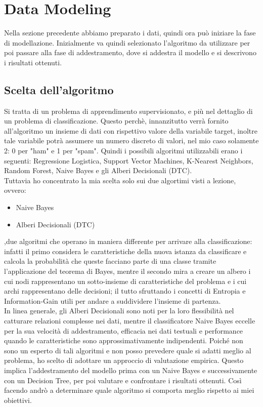 \documentclass[]{article}
\begin{document}
        \newpage
        \section{Data Modeling}
            Nella sezione precedente abbiamo preparato i dati, quindi ora può iniziare la fase di modellazione. Inizialmente va quindi selezionato l’algoritmo da
            utilizzare per poi passare alla fase di addestramento, dove si addestra il modello e si descrivono i risultati ottenuti.

            \subsection{Scelta dell'algoritmo}
                Si tratta di un problema di apprendimento supervisionato, e più nel dettaglio di un problema di classificazione. Questo perchè, innanzitutto verrà fornito all'algoritmo un insieme di dati con rispettivo valore della variabile target, inoltre tale variabile potrà assumere un numero discreto di valori, nel mio caso solamente 2: 0 per "ham" e 1 per "spam". Quindi i possibili algoritmi utilizzabili erano i seguenti: Regressione Logistica, Support Vector Machines, K-Nearest Neighbors, Random Forest, Naive Bayes e gli Alberi Decisionali (DTC).\\
                Tuttavia ho concentrato la mia scelta solo sui due algortimi visti a lezione, ovvero:
                \begin{itemize}
                    \item Naive Bayes
                    \item Alberi Decisionali (DTC)
                \end{itemize}
                ,due algoritmi che operano in maniera differente per arrivare alla classificazione: infatti il primo considera le caratteristiche della nuova istanza da classificare e calcola la probabilità che queste facciano parte di una classe tramite l’applicazione del teorema di Bayes, mentre il secondo mira a creare un albero i cui nodi rappresentano un sotto-insieme di caratteristiche del problema e i cui archi rappresentano delle decisioni; il tutto sfruttando i concetti di Entropia e Information-Gain utili per andare a suddividere l'insieme di partenza.\\
                In linea generale, gli Alberi Decisionali sono noti per la loro flessibilità nel catturare relazioni complesse nei dati, mentre il classificatore Naive Bayes eccelle per la sua velocità di addestramento, efficacia nei dati testuali e performance quando le caratteristiche sono approssimativamente indipendenti. Poiché non sono un esperto di tali algoritmi e non posso prevedere quale si adatti meglio al problema, ho scelto di adottare un approccio di valutazione empirica. Questo implica l'addestramento del modello prima con un Naive Bayes e successivamente con un Decision Tree, per poi valutare e confrontare i risultati ottenuti. Così facendo andrò a determinare quale algoritmo si comporta meglio rispetto ai miei obiettivi.
\end{document}
